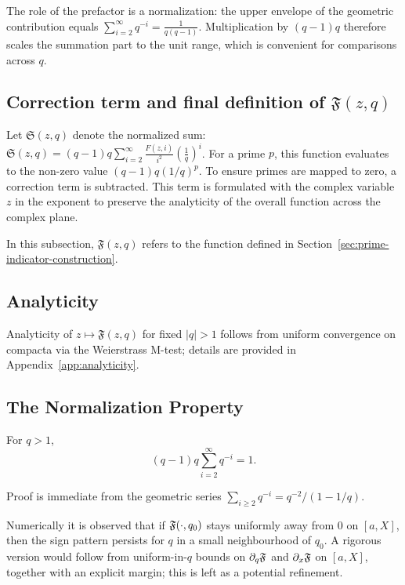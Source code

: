 The role of the prefactor is a normalization: the upper envelope of the geometric contribution equals $\sum_{i=2}^{\infty} q^{-i}=\frac{1}{q(q-1)}$. Multiplication by $(q-1)q$ therefore scales the summation part to the unit range, which is convenient for comparisons across $q$.

\subsection{Correction term and final definition of $\mathfrak{F}(z,q)$}
\label{app:correction-term}
Let $\mathfrak{S}(z,q)$ denote the normalized sum: $\mathfrak{S}(z,q) = (q-1)q \sum_{i=2}^{\infty} \frac{F(z,i)}{i^2} (\frac{1}{q})^i$. For a prime $p$, this function evaluates to the non-zero value $(q-1)q(1/q)^p$. To ensure primes are mapped to zero, a correction term is subtracted. This term is formulated with the complex variable $z$ in the exponent to preserve the analyticity of the overall function across the complex plane.

In this subsection, $\mathfrak{F}(z,q)$ refers to the function defined in Section~\ref{sec:prime-indicator-construction}.

\subsection{Analyticity}
\label{app:analyticity-brief}
Analyticity of $z\mapsto \mathfrak{F}(z,q)$ for fixed $|q|>1$ follows from uniform convergence on compacta via the Weierstrass M-test; details are provided in Appendix~\ref{app:analyticity}.


\subsection{The Normalization Property}
\begin{lemma}\label{lem:normalization}
For $q>1$,
\[
(q-1)q\sum_{i=2}^{\infty} q^{-i} = 1.
\]
\end{lemma}
\noindent Proof is immediate from the geometric series $\sum_{i\ge2}q^{-i}=q^{-2}/(1-1/q)$.

\begin{remark}\label{lem:q-bridge}
Numerically it is observed that if $\mathfrak F(\cdot,q_0)$ stays uniformly away from $0$ on $[a,X]$, then the sign pattern persists for $q$ in a small neighbourhood of $q_0$. A rigorous version would follow from uniform-in-$q$ bounds on $\partial_q\mathfrak F$ and $\partial_x\mathfrak F$ on $[a,X]$, together with an explicit margin; this is left as a potential refinement.
\end{remark}


